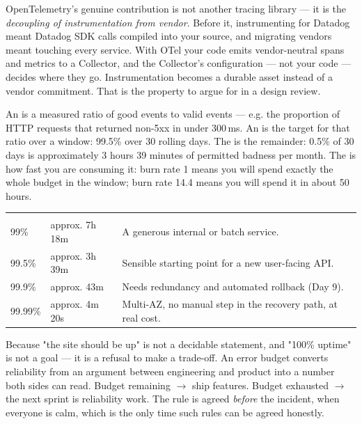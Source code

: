 \begin{seniornote}
OpenTelemetry's genuine contribution is not another tracing library --- it is the \emph{decoupling of instrumentation from vendor}. Before it, instrumenting for Datadog meant Datadog SDK calls compiled into your source, and migrating vendors meant touching every service. With OTel your code emits vendor-neutral spans and metrics to a Collector, and the Collector's configuration --- not your code --- decides where they go. Instrumentation becomes a durable asset instead of a vendor commitment. That is the property to argue for in a design review.
\end{seniornote}


 An  is a measured ratio of good events to valid events --- e.g. the proportion of HTTP requests that returned non-5xx in under 300\,ms. An  is the target for that ratio over a window: 99.5\% over 30 rolling days. The  is the remainder: 0.5\% of 30 days is approximately 3 hours 39 minutes of permitted badness per month. The  is how fast you are consuming it: burn rate 1 means you will spend exactly the whole budget in the window; burn rate 14.4 means you will spend it in about 50 hours.

\begin{center}\small
\wbrowcolors
\begin{tabularx}{\linewidth}{@{}L{22mm} C{24mm} X@{}}
 &  & \\
99\% & approx. 7h 18m & A generous internal or batch service.\\
99.5\% & approx. 3h 39m & Sensible starting point for a new user-facing API.\\
99.9\% & approx. 43m & Needs redundancy and automated rollback (Day 9).\\
99.99\% & approx. 4m 20s & Multi-AZ, no manual step in the recovery path, at real cost.\\
\end{tabularx}
\end{center}

 Because "the site should be up" is not a decidable statement, and "100\% uptime" is not a goal --- it is a refusal to make a trade-off. An error budget converts reliability from an argument between engineering and product into a number both sides can read. Budget remaining $\rightarrow$ ship features. Budget exhausted $\rightarrow$ the next sprint is reliability work. The rule is agreed \emph{before} the incident, when everyone is calm, which is the only time such rules can be agreed honestly.

